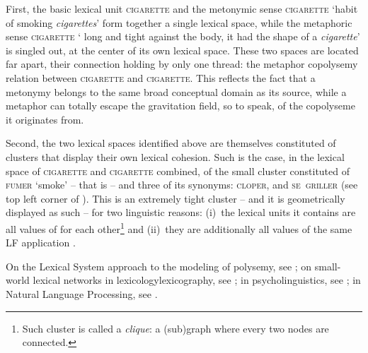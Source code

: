 First, the basic lexical unit \textsc{cigarette} and the metonymic sense \textsc{cigarette} `habit of smoking \textit{cigarettes}' form together a single lexical space, while the met\-aphoric sense \textsc{cigarette} ` long and tight against the body,  it had the shape of a \textit{cigarette}' is singled out, at the center of its own lexical space. These two spaces are located far apart, their connection holding by only one thread: the metaphor copolysemy relation between \textsc{cigarette} and \textsc{cigarette}. This reflects the fact that a metonymy belongs to the same broad conceptual domain as its source, while a metaphor can totally escape the gravitation field, so to speak, of the copolyseme it originates from.

Second, the two lexical spaces identified above are themselves constituted of clusters that display their own lexical cohesion. Such is the case, in the lexical space of \textsc{cigarette} and \textsc{cigarette} combined, of the small cluster constituted of \textsc{fumer} `smoke' -- that is  -- and three of its synonyms: \textsc{cloper},  and \textsc{se~griller} (see top left corner of ). This is an extremely tight cluster -- and it is geometrically displayed as such -- for two linguistic reasons: (i)~the lexical units it contains are all values of  for each other\footnote{Such cluster is called a \textit{clique}: a (sub)graph where every two nodes are connected.} and (ii)~they are additionally all values of the same LF application .

\begin{furtherreading}
On the Lexical System approach to the modeling of polysemy, see \textcite{Polguere2018c}; on small-world lexical networks in lexicology\slashs{}lexicography, see \textcite{LoiseauEtAl2010,Polguere2014c-e,Polguere2016b-e}; in psycholinguistics, see \textcite{GaumeEtAl2002,GaumeEtAl2008,DeDeyneEtAl2017}; in Natural Language Processing, see \textcite{Biemann2012}.
\end{furtherreading}

